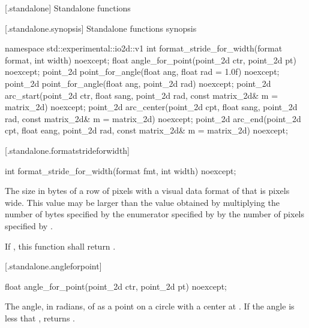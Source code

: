  [\iotwod.standalone] {Standalone functions}

 [\iotwod.standalone.synopsis] {Standalone functions synopsis}

\begin{codeblock}
namespace std::experimental::io2d::v1 {
  int format_stride_for_width(format format, int width) noexcept;
  float angle_for_point(point_2d ctr, point_2d pt) noexcept;
  point_2d point_for_angle(float ang, float rad = 1.0f) noexcept;
  point_2d point_for_angle(float ang, point_2d rad) noexcept;
  point_2d arc_start(point_2d ctr, float sang, point_2d rad, 
    const matrix_2d& m = matrix_2d{}) noexcept;
  point_2d arc_center(point_2d cpt, float sang, point_2d rad, 
    const matrix_2d& m = matrix_2d{}) noexcept;
  point_2d arc_end(point_2d cpt, float eang, point_2d rad, 
    const matrix_2d& m = matrix_2d{}) noexcept;
}
\end{codeblock}

 [\iotwod.standalone.formatstrideforwidth] {}

%
\begin{itemdecl}
int format_stride_for_width(format fmt, int width) noexcept;
\end{itemdecl}
\begin{itemdescr}
\pnum
\returns
The size in bytes of a row of pixels with a visual data format of  that is  pixels wide. This value may be larger than the value obtained by multiplying the number of bytes specified by the  enumerator specified by  by the number of pixels specified by .

\pnum
If , this function shall return .
\end{itemdescr}

 [\iotwod.standalone.angleforpoint] {}

%
\begin{itemdecl}
float angle_for_point(point_2d ctr, point_2d pt) noexcept;
\end{itemdecl}
\begin{itemdescr}
\pnum
\returns
The angle, in radians, of  as a point on a circle with a center at . If the angle is less that , returns .
\end{itemdescr}


